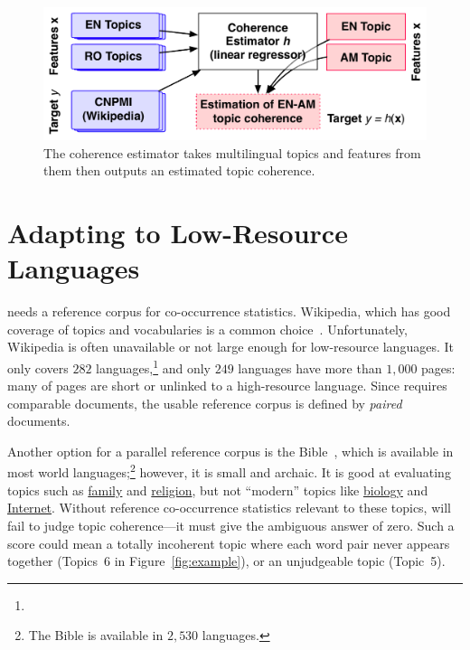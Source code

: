 
\begin{figure}
	\centering
	\includegraphics[width=\linewidth]{2018_naacl_mltm_eval/figures/calibrator}
	\caption{The coherence estimator takes multilingual topics and
          features from them then outputs an estimated topic coherence.}
	\label{fig:calibrator}
\end{figure}

\section{Adapting to Low-Resource Languages}
\label{sec:coherence-estimator}







\cnpmi{} needs a reference corpus for co-occurrence statistics.
Wikipedia, which has good coverage of topics and vocabularies is a
common choice~\cite{JHL16}.  Unfortunately, Wikipedia is often
unavailable or not large enough for low-resource languages. It only
covers $282$
languages,\footnote{}
and only $249$ languages have more than $1{,}000$ pages: many of pages
are short or unlinked to a high-resource language. Since \cnpmi{}
requires comparable documents, the usable reference corpus is
defined by \emph{paired} documents.

Another option for a parallel reference corpus is the Bible~\cite{resnik-99}, which
is available in most world languages;\footnote{The Bible
  is available in $2{,}530$ languages.} however, it is small
and archaic. It is good at evaluating topics such as
\underline{family} and \underline{religion}, but not ``modern'' topics
like \underline{biology} and \underline{Internet}.  Without reference
co-occurrence statistics relevant to these topics, \cnpmi{} will fail
to judge topic coherence---it must give the ambiguous answer of zero.
Such a score could mean a totally incoherent topic where each word
pair never appears together (Topics~6 in Figure~\ref{fig:example}), or
an unjudgeable topic (Topic~5).


